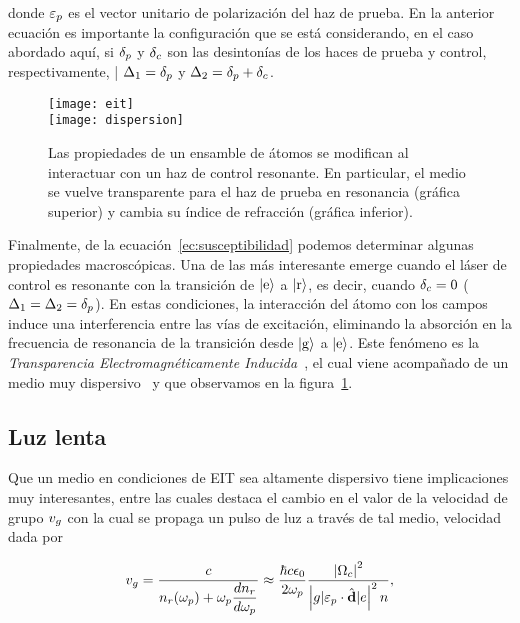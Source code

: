 donde $\varepsilon_{p}$ es el vector unitario de polarización del haz de prueba. En la anterior ecuación es importante la configuración que se está considerando, en el caso abordado aquí, si $\delta_{p}$ y $\delta_{c}$ son las desintonías de los haces de prueba y control, respectivamente, | $\Delta_{1}=\delta_{p}$ y $\Delta_{2}=\delta_{p}+\delta_{c}$.

\begin{figure}[H]
\centering
\begin{minipage}{0.8\textwidth}
\centering
\texttt{[image: eit]}\\
\texttt{[image: dispersion]}
\caption{\label{fig:eitDispersion}Las propiedades de un ensamble de átomos se modifican al interactuar con un haz de control resonante. En particular, el medio se vuelve transparente para el haz de prueba en resonancia (gráfica superior) y cambia su índice de refracción (gráfica inferior).}
\end{minipage}
\end{figure}

\p Finalmente, de la ecuación~\ref{ec:susceptibilidad} podemos determinar algunas propiedades macroscópicas. Una de las más interesante emerge cuando el láser de control es resonante con la transición de $\ket{e}$ a $\ket{r}$, es decir, cuando $\delta_{c}=0$ ($\Delta_{1}=\Delta_{2}=\delta_{p}$). En estas condiciones, la interacción del átomo con los campos induce una interferencia entre las vías de excitación, eliminando la absorción en la frecuencia de resonancia de la transición desde $\ket{g}$ a $\ket{e}$. Este fenómeno es la \emph{Transparencia Electromagnéticamente Inducida}~\cite{fleischhauer}, el cual viene acompañado de un medio muy dispersivo~\cite{harris,scully} y que observamos en la figura~\ref{fig:eitDispersion}.

\subsection{\label{sub:luzLenta}Luz lenta}

Que un medio en condiciones de EIT sea altamente dispersivo tiene implicaciones muy interesantes, entre las cuales destaca el cambio en el valor de la velocidad de grupo $v_{g}$ con la cual se propaga un pulso de luz a través de tal medio, velocidad dada por~\cite{harris}	

\begin{equation}
\label{ec:velocidadGrupo}
v_\sm{g}=\dfrac{c}{n_\sm{r}(\omega_\sm{p})+\omega_\sm{p}\dfrac{dn_\sm{r}}{d\omega_\sm{p}}}\approx\dfrac{\hbar c\epsilon_\sm{0}}{2\omega_\sm{p}}\dfrac{\abs{\Omega_\sm{c}}^{2}}{\abs{\braket{g|\varepsilon_\sm{p}\cdot\hat{\vektor{d}}|e}}^{2}n},
\end{equation}

